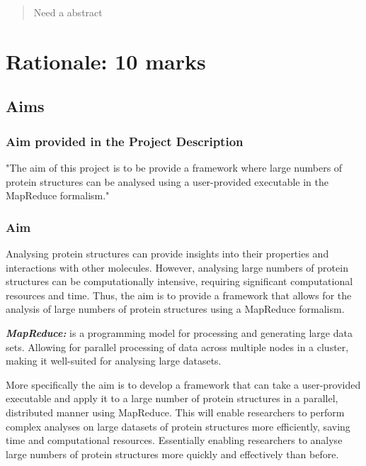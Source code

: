 \documentclass[]{final_report}
\begin{document}
\maketitle

\newtheorem{definition}{Definition}[section]
\renewcommand\thesection{\arabic{section}}

\begin{abstract}
    Need a abstract
\end{abstract}

\section{Rationale: 10 marks}
\subsection{Aims}
\subsubsection{Aim provided in the Project Description}
"The aim of this project is to be provide a framework where large numbers of protein structures can be analysed using a user-provided executable in the MapReduce formalism."

\subsubsection{Aim}
Analysing protein structures can provide insights into their properties and interactions with other molecules. However, analysing large numbers of protein structures can be computationally intensive, requiring significant computational resources and time. Thus, the aim is to provide a framework that allows for the analysis of large numbers of protein structures using a MapReduce formalism.

\textbf{\textit{MapReduce:}} is a programming model for processing and generating large data sets. Allowing for parallel processing of data across multiple nodes in a cluster, making it well-suited for analysing large datasets.

More specifically the aim is to develop a framework that can take a user-provided executable and apply it to a large number of protein structures in a parallel, distributed manner using MapReduce. This will enable researchers to perform complex analyses on large datasets of protein structures more efficiently, saving time and computational resources. Essentially enabling researchers to analyse large numbers of protein structures more quickly and effectively than before.\\
\clearpage
\end{document}
